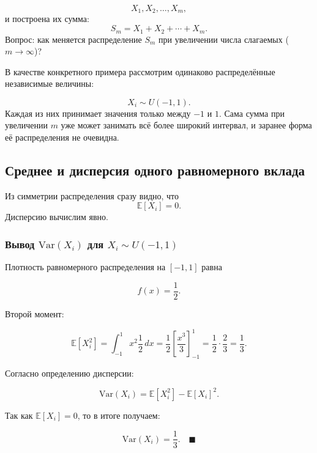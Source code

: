 \documentclass[
  russian,
  12pt,
  a4paper,
  a4paper,
  openany]{scrbook}
\begin{document}
\[X_1,X_2,\ldots,X_m,\] и построена их сумма:
\[\boxed{S_m=X_1+X_2+\cdots+X_m.}\] Вопрос: как меняется распределение
\(S_m\) при увеличении числа слагаемых (\(m\rightarrow \infty\))?

В качестве конкретного примера рассмотрим одинаково распределённые
независимые величины:

\[X_i\sim U(-1,1).\] Каждая из них принимает значения только между
\(-1\) и \(1\). Сама сумма при увеличении \(m\) уже может занимать всё
более широкий интервал, и заранее форма её распределения не очевидна.

\subsection{Среднее и дисперсия одного равномерного
вклада}\label{ux441ux440ux435ux434ux43dux435ux435-ux438-ux434ux438ux441ux43fux435ux440ux441ux438ux44f-ux43eux434ux43dux43eux433ux43e-ux440ux430ux432ux43dux43eux43cux435ux440ux43dux43eux433ux43e-ux432ux43aux43bux430ux434ux430}

Из симметрии распределения сразу видно, что \[\mathbb{E}[X_i]=0.\]
Дисперсию вычислим явно.

\begin{bookderivation}

\subsubsection{\texorpdfstring{Вывод \(\mathrm{Var}(X_i)\) для
\(X_i\sim U(-1,1)\)}{Вывод \textbackslash mathrm\{Var\}(X\_i) для X\_i\textbackslash sim U(-1,1)}}\label{ux432ux44bux432ux43eux434-mathrmvarx_i-ux434ux43bux44f-x_isim-u-11}

Плотность равномерного распределения на \([-1,1]\) равна

\[f(x)=\frac12.\]

Второй момент:

\[\mathbb{E}[X_i^2]
=\int_{-1}^{1}x^2\frac12\,dx=\frac12\left[\frac{x^3}{3}\right]_{-1}^{1}=\frac12\cdot\frac{2}{3}
=\frac13.\]

Согласно определению дисперсии:

\[\mathrm{Var}(X_i)
=\mathbb{E}[X_i^2]-\mathbb{E}[X_i]^2.\]

Так как \(\mathbb{E}[X_i]=0\), то в итоге получаем:

\[\boxed{\mathrm{Var}(X_i)=\frac13.}\quad\blacksquare\]

\end{bookderivation}
\end{document}
